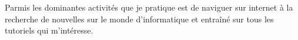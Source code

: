 \documentclass[10pt,A4]{article}
\begin{document}
\begin{minipage}{0.59\textwidth}
{		%
		\parbox[b][3cm][c]{3.5cm}{
			\textcolor{textcol}{Parmis les dominantes activités que je pratique est de naviguer sur internet à la recherche de nouvelles sur le monde d'informatique et  entraîné sur tous les tutoriels qui m'intéresse.}
		}

	}

\end{minipage}
\hspace{2pt}
\end{document}
